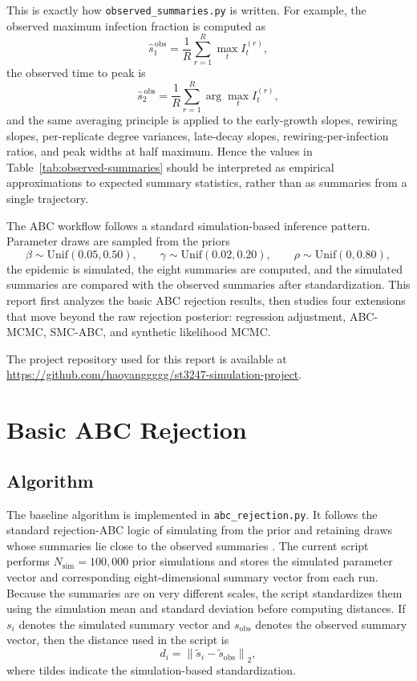 \documentclass[11pt]{article}
\begin{document}
This is exactly how \texttt{observed\_summaries.py} is written. For example, the observed maximum infection fraction is computed as
\[
\widehat{s}^{\,\mathrm{obs}}_1
= \frac{1}{R}\sum_{r=1}^{R} \max_t I_t^{(r)},
\]
the observed time to peak is
\[
\widehat{s}^{\,\mathrm{obs}}_2
= \frac{1}{R}\sum_{r=1}^{R} \arg\max_t I_t^{(r)},
\]
and the same averaging principle is applied to the early-growth slopes, rewiring slopes, per-replicate degree variances, late-decay slopes, rewiring-per-infection ratios, and peak widths at half maximum. Hence the values in Table~\ref{tab:observed-summaries} should be interpreted as empirical approximations to expected summary statistics, rather than as summaries from a single trajectory.

The ABC workflow follows a standard simulation-based inference pattern. Parameter draws are sampled from the priors
\[
\beta \sim \mathrm{Unif}(0.05,0.50), \qquad
\gamma \sim \mathrm{Unif}(0.02,0.20), \qquad
\rho \sim \mathrm{Unif}(0,0.80),
\]
the epidemic is simulated, the eight summaries are computed, and the simulated summaries are compared with the observed summaries after standardization. This report first analyzes the basic ABC rejection results, then studies four extensions that move beyond the raw rejection posterior: regression adjustment, ABC-MCMC, SMC-ABC, and synthetic likelihood MCMC.

The project repository used for this report is available at \url{https://github.com/haoyanggggg/st3247-simulation-project}.
\section{Basic ABC Rejection}

\subsection{Algorithm}

The baseline algorithm is implemented in \texttt{abc\_rejection.py}. It follows the standard rejection-ABC logic of simulating from the prior and retaining draws whose summaries lie close to the observed summaries \citep{beaumont2002}. The current script performs $N_{\text{sim}}=100{,}000$ prior simulations and stores the simulated parameter vector and corresponding eight-dimensional summary vector from each run. Because the summaries are on very different scales, the script standardizes them using the simulation mean and standard deviation before computing distances. If $s_i$ denotes the simulated summary vector and $s_{\text{obs}}$ denotes the observed summary vector, then the distance used in the script is
\[
d_i = \left\lVert \tilde{s}_i - \tilde{s}_{\text{obs}} \right\rVert_2,
\]
where tildes indicate the simulation-based standardization.
\end{document}

